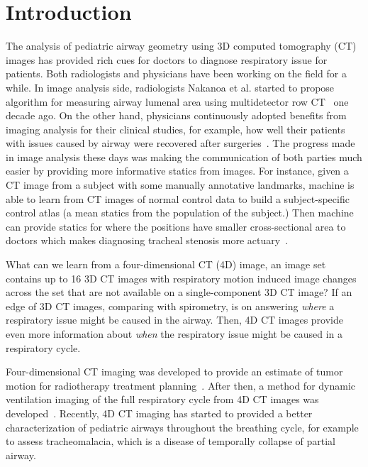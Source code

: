 \section{Introduction}
\label{sec:intro}

The analysis of pediatric airway geometry using 3D computed tomography (CT) images has provided rich cues for doctors to diagnose respiratory issue for patients.
Both radiologists and physicians have been working on the field for a while.
In image analysis side, radiologists Nakanoa et al. started to propose algorithm for measuring airway lumenal area using multidetector row CT~\cite{nakano2002development} one decade ago.
On the other hand, physicians continuously adopted benefits from imaging analysis for their clinical studies, for example, how well their patients with issues caused by airway were recovered after surgeries~\cite{abramson2011three}.
The progress made in image analysis these days was making the communication of both parties much easier by providing more informative statics from images.
For instance, given a CT image from a subject with some manually annotative landmarks, machine is able to learn from CT images of normal control data to build a subject-specific control atlas (a mean statics from the population of the subject.) 
Then machine can provide statics for where the positions have smaller cross-sectional area to doctors which makes diagnosing tracheal stenosis more actuary~\cite{hong2014statistical}.

What can we learn from a four-dimensional CT (4D) image, an image set contains up to 16 3D CT images with respiratory motion induced image changes across the set that are not available on a single-component 3D CT image?
If an edge of 3D CT images, comparing with spirometry, is on answering {\it where} a respiratory issue might be caused in the airway.
Then, 4D CT images provide even more information about {\it when} the respiratory issue might be caused in a respiratory cycle.

Four-dimensional CT imaging was developed to provide an estimate of tumor motion for radiotherapy treatment planning~\cite{ford2003respiration}.
After then, a method for dynamic ventilation imaging of the full respiratory cycle from 4D CT images was developed~\cite{guerrero2006dynamic}.
Recently, 4D CT imaging has started to provided a better characterization of pediatric airways throughout the breathing cycle, for example to assess tracheomalacia, which is a disease of temporally collapse of partial airway.

